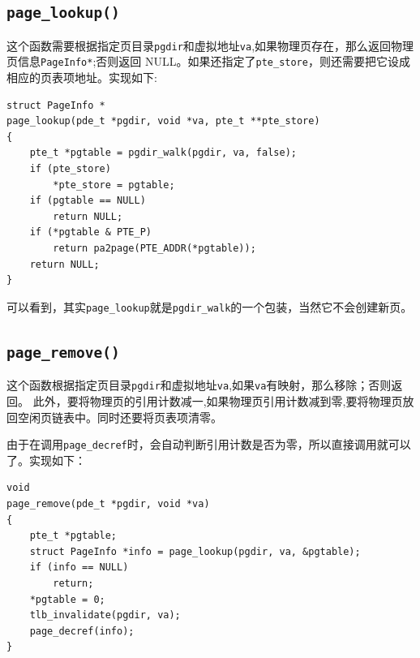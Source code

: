 \documentclass[11pt]{article}
\begin{document}
\subsection{\lstinline|page_lookup()|}
这个函数需要根据指定页目录\lstinline|pgdir|和虚拟地址\lstinline|va|,如果物理页存在，那么返回物理页信息\lstinline|PageInfo*|;否则返回 NULL。如果还指定了\lstinline|pte_store|，则还需要把它设成相应的页表项地址。实现如下:

\begin{lstlisting}[title=kern/pmap.c]
struct PageInfo *
page_lookup(pde_t *pgdir, void *va, pte_t **pte_store)
{
	pte_t *pgtable = pgdir_walk(pgdir, va, false);
	if (pte_store)
		*pte_store = pgtable;
	if (pgtable == NULL)
		return NULL;
	if (*pgtable & PTE_P)
		return pa2page(PTE_ADDR(*pgtable));
	return NULL;
}
\end{lstlisting}

可以看到，其实\lstinline|page_lookup|就是\lstinline|pgdir_walk|的一个包装，当然它不会创建新页。

\subsection{\lstinline|page_remove()|}
这个函数根据指定页目录\lstinline|pgdir|和虚拟地址\lstinline|va|,如果\lstinline|va|有映射，那么移除；否则返回。
此外，要将物理页的引用计数减一,如果物理页引用计数减到零,要将物理页放回空闲页链表中。同时还要将页表项清零。

由于在调用\lstinline|page_decref|时，会自动判断引用计数是否为零，所以直接调用就可以了。实现如下：
\begin{lstlisting}
void
page_remove(pde_t *pgdir, void *va)
{
	pte_t *pgtable;
	struct PageInfo *info = page_lookup(pgdir, va, &pgtable);
	if (info == NULL)
		return;
	*pgtable = 0;
	tlb_invalidate(pgdir, va);
	page_decref(info);
}
\end{lstlisting}
\end{document}
